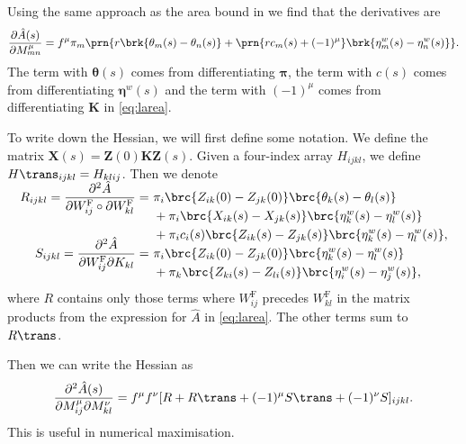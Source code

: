 \documentclass[12pt]{article}
\newcommand{\eqm}{\pi}
\newcommand{\eq}{\boldsymbol{\eqm}}
\newcommand{\fundm}{Z}
\newcommand{\fund}{\mathbf{\fundm}}
\newcommand{\etwm}{\eta^w}
\newcommand{\etw}{\boldsymbol{\eta}^w}
\newcommand{\thbm}{\theta}
\newcommand{\thb}{\boldsymbol{\thbm}}
\newcommand{\Wm}{W}
\newcommand{\MMdm}{M}
\newcommand{\encm}{K}
\newcommand{\enc}{\mathbf{\encm}}
\newcommand{\frgm}{\Wm^{\mathrm{F}}}
\renewcommand{\pdiff}[2]{\frac{\partial #1}{\partial #2}}
\begin{document}
Using the same approach as the area bound in \cite{Lahiri2013synapse} we find that the derivatives are
%
\begin{equation}\label{eq:lAdiff}
  \pdiff{\hat{A}(s)}{\MMdm^\mu_{mn}}
     = f^\mu \eqm_m \prn{ r \brk{\thbm_m(s) - \thbm_n(s)}
     +\prn{r {c}_m(s) + (-1)^\mu} \brk{\etwm_m(s) - \etwm_n(s)} }.
\end{equation}
%
The term with \(\thb(s)\) comes from differentiating \(\eq\), the term with \(c(s)\) comes from differentiating \(\etw(s)\) and the term with \((-1)^\mu\) comes from differentiating \(\enc\) in \eqref{eq:larea}.

To write down the Hessian, we will first define some notation.
We define the matrix \(\mathbf{X}(s) = \fund(0) \enc \fund(s)\).
Given a four-index array \(H_{ijkl}\), we define \(H\trans_{ijkl} = H_{klij}\).
Then we denote
%
\begin{equation}\label{eq:hessparts}
\begin{alignedat}{3}
    R_{ijkl} = \smash{\pdiff{^2 \hat{A}}{\frgm_{ij} \circ \partial \frgm_{kl}}} 
    &= \
    &&\eqm_i \brc{\fundm_{ik}(0) - \fundm_{jk}(0)} \brc{\thbm_k(s) - \thbm_l(s)} \\
    &&&+ \eqm_i \brc{{X}_{ik}(s) - {X}_{jk}(s)} 
          \brc{\etwm_k(s) - \etwm_l(s)} \\
    &&&+ \eqm_i {c}_i(s) \brc{\fundm_{ik}(s) - \fundm_{jk}(s)} 
          \brc{\etwm_k(s) - \etwm_l(s)},  \\
  S_{ijkl} = \smash{\pdiff{^2 \hat{A}}{\frgm_{ij} \partial \encm_{kl}} }
  &= \
    &&\eqm_i \brc{\fundm_{ik}(0) - \fundm_{jk}(0)} \brc{\etwm_k(s) - \etwm_l(s)} \\
    &&&+ \eqm_k \brc{\fundm_{ki}(s) - \fundm_{li}(s)} \brc{\etwm_i(s) - \etwm_j(s)},
\end{alignedat}
\end{equation}
%
where \(R\) contains only those terms where \( \frgm_{ij} \) precedes \( \frgm_{kl} \) in the matrix products from the expression for \( \hat{A} \) in \cref{eq:larea}.
The other terms sum to \(R\trans\).

Then we can write the Hessian as
%
\begin{equation}\label{eq:hessian}
  \pdiff{^2\hat{A}(s)}{\MMdm^\mu_{ij} \partial \MMdm^\nu_{kl}} =
     f^\mu f^\nu [R + R\trans + (-1)^\mu S\trans + (-1)^\nu S]_{ijkl}.
\end{equation}
%
This is useful in numerical maximisation.

\end{document}
